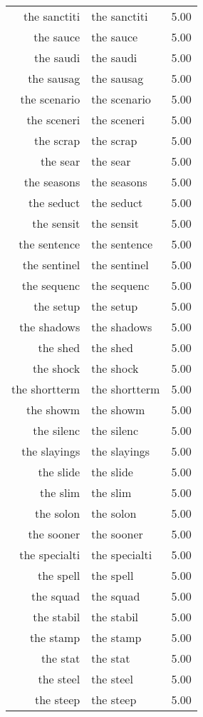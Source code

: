 \begin{table}[ht]
\begin{tabular}{rlr}
  the sanctiti & the sanctiti & 5.00 \\ 
  the sauce & the sauce & 5.00 \\ 
  the saudi & the saudi & 5.00 \\ 
  the sausag & the sausag & 5.00 \\ 
  the scenario & the scenario & 5.00 \\ 
  the sceneri & the sceneri & 5.00 \\ 
  the scrap & the scrap & 5.00 \\ 
  the sear & the sear & 5.00 \\ 
  the seasons & the seasons & 5.00 \\ 
  the seduct & the seduct & 5.00 \\ 
  the sensit & the sensit & 5.00 \\ 
  the sentence & the sentence & 5.00 \\ 
  the sentinel & the sentinel & 5.00 \\ 
  the sequenc & the sequenc & 5.00 \\ 
  the setup & the setup & 5.00 \\ 
  the shadows & the shadows & 5.00 \\ 
  the shed & the shed & 5.00 \\ 
  the shock & the shock & 5.00 \\ 
  the shortterm & the shortterm & 5.00 \\ 
  the showm & the showm & 5.00 \\ 
  the silenc & the silenc & 5.00 \\ 
  the slayings & the slayings & 5.00 \\ 
  the slide & the slide & 5.00 \\ 
  the slim & the slim & 5.00 \\ 
  the solon & the solon & 5.00 \\ 
  the sooner & the sooner & 5.00 \\ 
  the specialti & the specialti & 5.00 \\ 
  the spell & the spell & 5.00 \\ 
  the squad & the squad & 5.00 \\ 
  the stabil & the stabil & 5.00 \\ 
  the stamp & the stamp & 5.00 \\ 
  the stat & the stat & 5.00 \\ 
  the steel & the steel & 5.00 \\ 
  the steep & the steep & 5.00 \\ 

\end{tabular}
\end{table}
